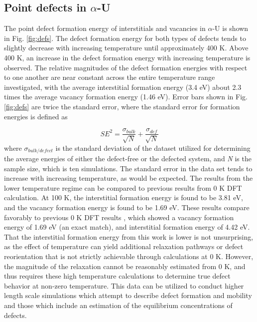 \documentclass[utf8]{frontiersSCNS} %
\begin{document}
\FloatBarrier

\subsection{Point defects in $\alpha$-U}

The point defect formation energy of interstitials and vacancies in $\alpha$-U is shown in Fig. \ref{fig:defs}. The defect formation energy for both types of defects tends to slightly decrease with increasing temperature until approximately 400 K. Above 400 K, an increase in the defect formation energy with increasing temperature is observed. The relative magnitudes of the defect formation energies with respect to one another are near constant across the entire temperature range investigated, with the average interstitial formation energy (3.4 eV) about 2.3 times the average vacancy formation energy (1.46 eV). Error bars shown in Fig. \ref{fig:defs} are twice the standard error, where the standard error for formation energies is defined as 

\begin{equation}
\label{eq:surf}
SE^2 = \frac{\sigma_{bulk}}{\sqrt{N}} + \frac{\sigma_{def}}{\sqrt{N}}
\end{equation}where $\sigma_{bulk/defect}$ is the standard deviation of the dataset utilized for determining the average energies of either the defect-free or the defected system, and \textit{N} is the sample size, which is ten simulations. The standard error in the data set tends to increase with increasing temperature, as would be expected. The results from the lower temperature regime can be compared to previous results from 0 K DFT calculation. At 100 K, the interstitial formation energy is found to be 3.81 eV, and the vacancy formation energy is found to be 1.69 eV. These results compare favorably to previous 0 K DFT results \cite{wirth2011}, which showed a vacancy formation energy of 1.69 eV (an exact match), and interstitial formation energy of 4.42 eV. That the interstitial formation energy from this work is lower is not unsurprising, as the effect of temperature can yield additional relaxation pathways or defect reorientation that is not strictly achievable through calculations at 0 K. However, the magnitude of the relaxation cannot be reasonably estimated from 0 K, and thus requires these high temperature calculations to determine true defect behavior at non-zero temperature. This data can be utilized to conduct higher length scale simulations which attempt to describe defect formation and mobility and those which include an estimation of the equilibrium concentrations of defects. 
 
\end{document}
